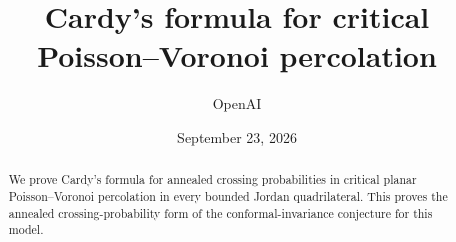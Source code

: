 \documentclass[11pt]{article}
\title{Cardy's formula for critical Poisson--Voronoi percolation}
\author{OpenAI}
\date{September 23, 2026}
\numberwithin{equation}{section}
\theoremstyle{definition}
\begin{document}
\maketitle
\begin{abstract}
We prove Cardy's formula for annealed crossing probabilities in critical
planar Poisson--Voronoi percolation in every bounded Jordan quadrilateral.
This proves the annealed crossing-probability form of the conformal-invariance
conjecture for this model.
\end{abstract}
\tableofcontents











\end{document}
